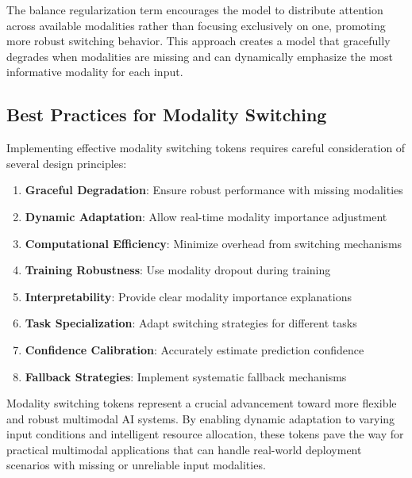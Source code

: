 The balance regularization term encourages the model to distribute attention across available modalities rather than focusing exclusively on one, promoting more robust switching behavior. This approach creates a model that gracefully degrades when modalities are missing and can dynamically emphasize the most informative modality for each input.

\subsection{Best Practices for Modality Switching}

Implementing effective modality switching tokens requires careful consideration of several design principles:

\begin{enumerate}
\item \textbf{Graceful Degradation}: Ensure robust performance with missing modalities
\item \textbf{Dynamic Adaptation}: Allow real-time modality importance adjustment
\item \textbf{Computational Efficiency}: Minimize overhead from switching mechanisms
\item \textbf{Training Robustness}: Use modality dropout during training
\item \textbf{Interpretability}: Provide clear modality importance explanations
\item \textbf{Task Specialization}: Adapt switching strategies for different tasks
\item \textbf{Confidence Calibration}: Accurately estimate prediction confidence
\item \textbf{Fallback Strategies}: Implement systematic fallback mechanisms
\end{enumerate}
\begin{comment}
Feedback: This is a good list. To make it more actionable:
1.  **Graceful Degradation**: "When evaluating your model, don't just test it with all modalities present. Create specific test sets with one or more modalities missing to explicitly measure how gracefully the performance degrades. This is a key indicator of a well-trained switching mechanism."
2.  **Training Robustness**: "Start with a modality dropout probability of around 0.3-0.5. If the model still seems to rely too heavily on one modality, you can increase the dropout rate for that specific modality."
3.  **Interpretability**: "During inference, log the modality importance weights that the switching token produces. This can provide valuable insights into your model's decision-making process and help you debug unexpected predictions."
\end{comment}

Modality switching tokens represent a crucial advancement toward more flexible and robust multimodal AI systems. By enabling dynamic adaptation to varying input conditions and intelligent resource allocation, these tokens pave the way for practical multimodal applications that can handle real-world deployment scenarios with missing or unreliable input modalities.

